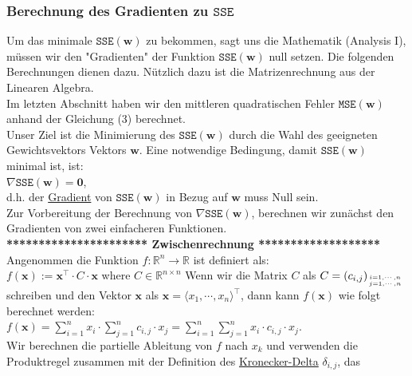 \documentclass[12pt]{article}
\begin{document}
\subsubsection{Berechnung des Gradienten zu $\mathtt{SSE}$}
%
Um das minimale  $\mathtt{SSE}(\mathbf{w})$ zu bekommen, sagt uns die Mathematik (Analysis I), müssen wir den "Gradienten" der Funktion $\mathtt{SSE}(\mathbf{w})$ null setzen. Die folgenden Berechnungen dienen dazu. Nützlich dazu ist die Matrizenrechnung aus der Linearen Algebra.\\[0.2cm]
%
Im letzten Abschnitt haben wir den mittleren quadratischen Fehler $\mathtt{MSE}(\mathbf{w})$ anhand der Gleichung (3) berechnet.\\
Unser Ziel ist die Minimierung des $\mathtt{SSE}(\mathbf{w})$ durch die Wahl des geeigneten Gewichtsvektors Vektors $\mathbf{w}$.  Eine notwendige Bedingung, damit $\mathtt{SSE}(\mathbf{w})$ minimal ist, ist: 
\\[0.2cm]
\hspace*{1.3cm}
$\nabla \mathtt{SSE}(\mathbf{w}) = \mathbf{0}$,
\\[0.2cm]
d.h. der \href{https://en.wikipedia.org/wiki/Gradient}{Gradient} von $\mathtt{SSE}(\mathbf{w})$ in Bezug auf $\mathbf{w}$ muss Null sein. \\
Zur Vorbereitung der Berechnung von $\nabla \mathtt{SSE}(\mathbf{w})$, berechnen wir zunächst den Gradienten von zwei einfacheren Funktionen.\\[0.4cm]
\textbf{********************** Zwischenrechnung *******************}\\[0.4cm]
%
Angenommen die Funktion $f:\mathbb{R}^n \rightarrow \mathbb{R}$ ist definiert als:
\\[0.2cm]
\hspace*{1.3cm}
$f(\mathbf{x}) := \mathbf{x}^\top \cdot C \cdot \mathbf{x}$ \quad where $C \in \mathbb{R}^{n \times n}$
%
Wenn wir die Matrix $C$ als $C = (c_{i,j})_{i=1,\cdots,n \atop j=1,\cdots,n}$ schreiben und den Vektor
$\mathbf{x}$ als $\mathbf{x} = \langle x_1, \cdots, x_n \rangle^\top$, dann kann $f(\mathbf{x})$ wie folgt berechnet werden:
\\[0.2cm]
\hspace*{1.3cm}
$ f(\mathbf{x}) = \sum\limits_{i=1}^n x_i \cdot \sum\limits_{j=1}^n c_{i,j} \cdot x_j = \sum\limits_{i=1}^n \sum\limits_{j=1}^n x_i \cdot c_{i,j} \cdot x_j $.
\\[0.2cm]
Wir berechnen die partielle Ableitung von $f$ nach $x_k$ und verwenden die Produktregel zusammen mit der
Definition des \href{https://en.wikipedia.org/wiki/Kronecker_delta}{Kronecker-Delta} $\delta_{i,j}$, das
\end{document}
